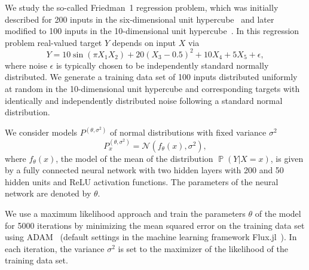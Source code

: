 \documentclass{article}
\DeclareMathOperator{\Prob}{\mathbb{P}}
\begin{document}
We study the so-called Friedman~1 regression problem, which was initially
described for 200 inputs in the six-dimensional unit
hypercube~\citep{Friedman1979,Friedman1983} and later modified to 100 inputs in
the 10-dimensional unit hypercube~\citep{Friedman1991}. In this regression
problem real-valued target $Y$ depends on input $X$ via
\begin{equation*}
    Y = 10 \sin{(\pi X_1 X_2)} + 20{(X_3 - 0.5)}^2 + 10 X_4 + 5 X_5 + \epsilon,
\end{equation*}
where noise $\epsilon$ is typically chosen to be independently standard
normally distributed. We generate a training data set of 100 inputs distributed
uniformly at random in the 10-dimensional unit hypercube and corresponding targets
with identically and independently distributed noise following a standard normal
distribution.

We consider models $P^{(\theta,\sigma^2)}$ of normal distributions with fixed variance
$\sigma^2$
\begin{equation*}
    P^{(\theta,\sigma^2)}_x = \mathcal{N}(f_{\theta}(x), \sigma^2),
\end{equation*}
where $f_{\theta}(x)$, the model of the mean of the distribution $\Prob(Y|X = x)$,
is given by a fully connected neural network with two hidden layers with 200 and 50
hidden units and ReLU activation functions. The parameters of the neural network
are denoted by $\theta$.

We use a maximum likelihood approach and train the parameters $\theta$ of the model
for 5000 iterations by minimizing the mean squared error on the training data set
using ADAM~\citep{Kingma2015} (default settings in the machine learning
framework Flux.jl~\citep{Innes2018a,Innes2018b}). In each iteration, the
variance $\sigma^2$ is set to the maximizer of the likelihood of the training data
set.
\end{document}

